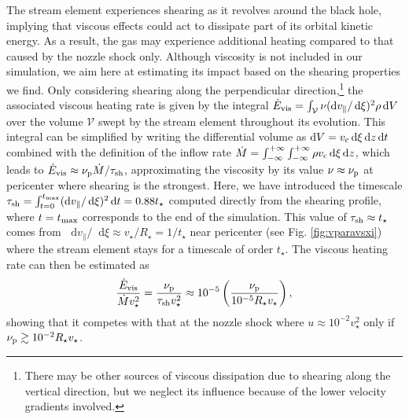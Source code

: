 \documentclass[a4paper,fleqn,usenatbib]{mnras}
\newcommand{\be}{\begin{equation}}
\newcommand{\ee}{\end{equation}}
\newcommand*\diff{\mathop{}\!\mathrm{d}}
\newcommand{\rstar}{R_{\star}}
\newcommand{\mdot}{\dot{M}}
\newcommand{\tstar}{t_{\star}}
\begin{document}
\label{sec:viscosity}

The stream element experiences shearing as it revolves around the black hole, implying that viscous effects could act to dissipate part of its orbital kinetic energy. As a result, the gas may experience additional heating compared to that caused by the nozzle shock only. Although viscosity is not included in our simulation, we aim here at estimating its impact based on the shearing properties we find. Only considering shearing along the perpendicular direction,\footnote{There may be other sources of viscous dissipation due to shearing along the vertical direction, but we neglect its influence because of the lower velocity gradients involved.} the associated viscous heating rate is given by the integral $\dot{E}_{\rm vis} =  \int_{\mathcal{V}} \nu  (\diff v_{\parallel}/\diff \xi)^2 \rho \diff V$ \citetext{equation (11.31) of \citealt{clarke2007}} over the volume $\mathcal{V}$ swept by the stream element throughout its evolution. This integral can be simplified by writing the differential volume as $\diff V = v_{\rm c} \diff \xi  \diff z \diff t$ combined with the definition of the inflow rate $\dot{M} = \int_{-\infty}^{+\infty} \int_{-\infty}^{+\infty} \rho v_{\rm c} \diff \xi \diff z$, which leads to $\dot{E}_{\rm vis} \approx \nu_{\rm p} \dot{M}/\tau_{\rm sh}$, approximating the viscosity by its value $\nu \approx \nu_{\rm p}$ at pericenter where shearing is the strongest. Here, we have introduced the timescale $\tau_{\rm sh} = \int_{t =0}^{t_{\rm max} } (\diff v_{\parallel}/\diff \xi)^2 \diff t = 0.88 \tstar$ computed directly from the shearing profile, where $t=t_{\rm max}$ corresponds to the end of the simulation. This value of $\tau_{\rm sh} \approx t_{\star}$ comes from $\diff v_{\parallel}/\diff \xi \approx v_{\star}/\rstar = 1/ \tstar$ near pericenter (see Fig. \ref{fig:vparavsxi}) where the stream element stays for a timescale of order $t_{\star}$. The viscous heating rate can then be estimated as
\be
\label{eq:edotvis}
\frac{\dot{E}_{\rm vis}}{\mdot v^2_{\star}} = \frac{ \nu_{\rm p}}{\tau_{\rm sh} v^2_{\star}} \approx   10^{-5} \left(\frac{\nu_{\rm p}}{10^{-5} \rstar v_{\star} } \right),
\ee
showing that it competes with that at the nozzle shock where $u \approx 10^{-2} v^2_{\star}$ only if $\nu_{\rm p} \gtrsim 10^{-2} \rstar v_{\star}$.
\end{document}
